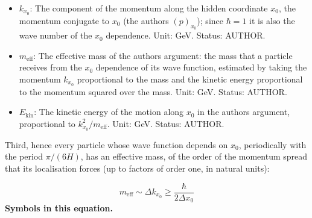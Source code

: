\documentclass[
  10pt,
]{article}
\providecommand{\tightlist}{%
  \setlength{\itemsep}{0pt}\setlength{\parskip}{0pt}}
\begin{document}
\begin{itemize}
\tightlist
\item
  \(k_{x_0}\): The component of the momentum along the hidden coordinate
  \(x_0\), the momentum conjugate to \(x_0\) (the
  author\textquotesingle s \((p)_{x_0}\)); since \(\hbar = 1\) it is
  also the wave number of the \(x_0\) dependence. Unit: GeV. Status:
  AUTHOR.
\item
  \(m_{\mathrm{eff}}\): The effective mass of the
  author\textquotesingle s argument: the mass that a particle receives
  from the \(x_0\) dependence of its wave function, estimated by taking
  the momentum \(k_{x_0}\) proportional to the mass and the kinetic
  energy proportional to the momentum squared over the mass. Unit: GeV.
  Status: AUTHOR.
\item
  \(E_{\mathrm{kin}}\): The kinetic energy of the motion along \(x_0\)
  in the author\textquotesingle s argument, proportional to
  \(k_{x_0}^2/m_{\mathrm{eff}}\). Unit: GeV. Status: AUTHOR.
\end{itemize}

Third, hence every particle whose wave function depends on \(x_0\),
periodically with the period \(\pi/(6H)\), has an effective mass, of the
order of the momentum spread that its localisation forces (up to factors
of order one, in natural units):

\[ m_{\mathrm{eff}} \sim \Delta k_{x_0} \ge \frac{\hbar}{2\Delta x_0} \]
\textbf{Symbols in this equation.}
\end{document}
